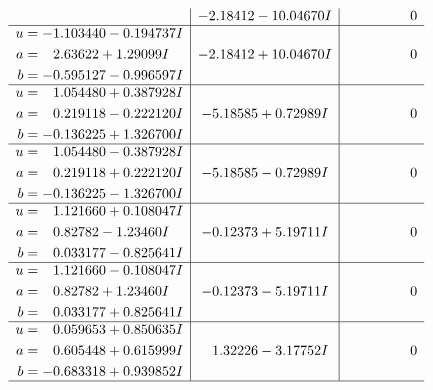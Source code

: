\documentclass[1p]{elsarticle_modified}
\theoremstyle{definition}
\begin{document}
$$\begin{array}{c|c|c}
 & -2.18412 - 10.04670 I & \phantom{-0.000000 } 0 \\ \hline\begin{aligned}
u &= -1.103440 - 0.194737 I \\
a &= \phantom{-}2.63622 + 1.29099 I \\
b &= -0.595127 - 0.996597 I\end{aligned}
 & -2.18412 + 10.04670 I & \phantom{-0.000000 } 0 \\ \hline\begin{aligned}
u &= \phantom{-}1.054480 + 0.387928 I \\
a &= \phantom{-}0.219118 - 0.222120 I \\
b &= -0.136225 + 1.326700 I\end{aligned}
 & -5.18585 + 0.72989 I & \phantom{-0.000000 } 0 \\ \hline\begin{aligned}
u &= \phantom{-}1.054480 - 0.387928 I \\
a &= \phantom{-}0.219118 + 0.222120 I \\
b &= -0.136225 - 1.326700 I\end{aligned}
 & -5.18585 - 0.72989 I & \phantom{-0.000000 } 0 \\ \hline\begin{aligned}
u &= \phantom{-}1.121660 + 0.108047 I \\
a &= \phantom{-}0.82782 - 1.23460 I \\
b &= \phantom{-}0.033177 - 0.825641 I\end{aligned}
 & -0.12373 + 5.19711 I & \phantom{-0.000000 } 0 \\ \hline\begin{aligned}
u &= \phantom{-}1.121660 - 0.108047 I \\
a &= \phantom{-}0.82782 + 1.23460 I \\
b &= \phantom{-}0.033177 + 0.825641 I\end{aligned}
 & -0.12373 - 5.19711 I & \phantom{-0.000000 } 0 \\ \hline\begin{aligned}
u &= \phantom{-}0.059653 + 0.850635 I \\
a &= \phantom{-}0.605448 + 0.615999 I \\
b &= -0.683318 + 0.939852 I\end{aligned}
 & \phantom{-}1.32226 - 3.17752 I & \phantom{-0.000000 } 0\\
 \hline 
 \end{array}$$\newpage$$\begin{array}{c|c|c}  

\end{array}$$
\end{document}
